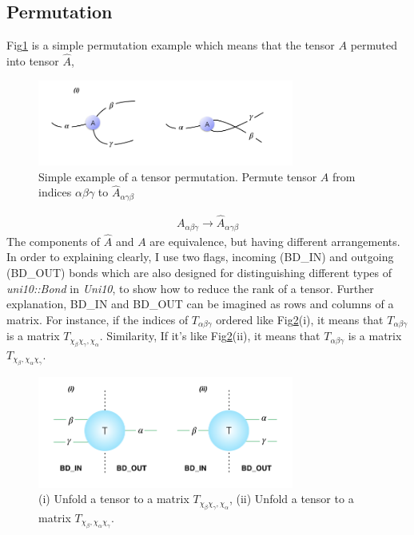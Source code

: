 \subsection{Permutation}
Fig\ref{fig224} is a simple permutation example which means that the tensor $A$ permuted into tensor $\hat{A}$, 
\begin{figure}[ht]
	\centering
	\includegraphics[width=0.75\textwidth]{figures/fig224.png}
	\caption[The process of permuting a tensor.]{Simple example of a tensor permutation. Permute tensor $A$ from indices $\alpha \beta \gamma$ to $\hat{A}_{\alpha \gamma \beta}$ }
	\label{fig224}
\end{figure}
\begin{align}
	A_{\alpha \beta \gamma} \rightarrow \hat{A}_{\alpha \gamma \beta}
\end{align}
The components of $\hat{A}$ and $A$ are equivalence, but having different arrangements.
In order to explaining clearly, I use two flags, incoming (BD\_IN) and outgoing (BD\_OUT) bonds which are also designed for distinguishing different types of \textit{uni10::Bond} in \textit{Uni10}, to show how to reduce the rank of a tensor. Further explanation, BD\_IN and BD\_OUT can be imagined as rows and columns of a matrix. For instance, if the indices of $T_{\alpha \beta \gamma}$ ordered like Fig\ref{fig221}(i), it means that $T_{\alpha \beta \gamma}$ is a matrix $T_{\chi_{\beta}\chi_{\gamma},\chi_{\alpha}}$. Similarity, If it's like Fig\ref{fig221}(ii), it means that $T_{\alpha \beta \gamma}$ is a matrix $T_{\chi_{\beta},\chi_{\alpha}\chi_{\gamma}}$.
\begin{figure}[ht]
	\centering
	\includegraphics[width=0.75\textwidth]{figures/fig221.png}
	\caption[Representaion of unfold tensors.]{(i) Unfold a tensor to a matrix $T_{\chi_{\beta}\chi_{\gamma},\chi_{\alpha}}$, (ii) Unfold a tensor to a matrix $T_{\chi_{\beta},\chi_{\alpha}\chi_{\gamma}}$.}
	\label{fig221}
\end{figure}
